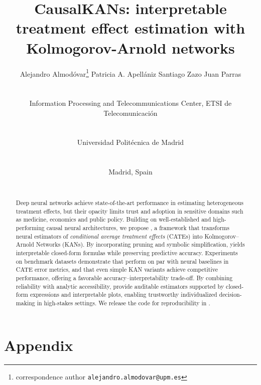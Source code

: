 \documentclass{article}
\title{CausalKANs: interpretable treatment effect estimation with Kolmogorov-Arnold networks}
\author{
  \centerline{Alejandro Almodóvar\thanks{correspondence author \texttt{alejandro.almodovar@upm.es}} 
  \quad Patricia A. Apellániz \quad Santiago Zazo \quad Juan Parras} \\ [4ex]
   \centerline{Information Processing and Telecommunications Center, ETSI de Telecomunicación}\\
  \centerline{Universidad Politécnica de Madrid}\\
  \centerline{Madrid, Spain} \\
}
\begin{document}
\maketitle

\doparttoc 
\faketableofcontents

\begin{abstract}

    Deep neural networks achieve state-of-the-art performance in estimating heterogeneous treatment effects, but their opacity limits trust and adoption in sensitive domains such as medicine, economics and public policy. Building on well-established and high-performing causal neural architectures, we propose \emph{\ours}, a framework that transforms neural estimators of \textit{conditional average treatment effects} (CATEs) into Kolmogorov–Arnold Networks (KANs). By incorporating pruning and symbolic simplification, \ours yields interpretable closed-form formulas while preserving predictive accuracy. Experiments on benchmark datasets demonstrate that \ours perform on par with neural baselines in CATE error metrics, and that even simple KAN variants achieve competitive performance, offering a favorable accuracy–interpretability trade-off. By combining reliability with analytic accessibility, \ours provide auditable estimators supported by closed-form expressions and interpretable plots, enabling trustworthy individualized decision-making in high-stakes settings. We release the code for reproducibility in \codeurl.
\end{abstract}





\clearpage







\appendix
\renewcommand{\partname}{}  
\clearpage
\part{Appendix} %





\end{document}
